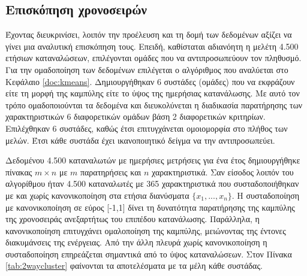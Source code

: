\subsection{Επισκόπηση χρονοσειρών}
Έχοντας διευκρινίσει, λοιπόν την προέλευση και τη δομή των δεδομένων αξίζει να γίνει μια αναλυτική επισκόπηση τους. Επειδή, καθίσταται αδιανόητη η μελέτη 4.500 ετήσιων καταναλώσεων, επιλέγονται ομάδες που να αντιπροσωπεύουν τον πληθυσμό. Για την ομαδοποίηση των δεδομένων επιλέγεται ο αλγόριθμος  που αναλύεται στο Κεφάλαιο \ref{doc:kmeans}. Δημιουργήθηκαν 6 συστάδες (ομάδες) που να εκφράζουν είτε τη μορφή της καμπύλης είτε το ύψος της ημερήσιας κατανάλωσης. Με αυτό τον τρόπο ομαδοποιούνται τα δεδομένα και διευκολύνεται η διαδικασία παρατήρησης των χαρακτηριστικών 6 διαφορετικών ομάδων βάση 2 διαφορετικών κριτηρίων. Επιλέχθηκαν 6 συστάδες, καθώς έτσι επιτυγχάνεται ομοιομορφία στο πλήθος των μελών. Έτσι κάθε συστάδα έχει ικανοποιητικό δείγμα να την αντιπροσωπεύει.\par
Δεδομένου 4.500 καταναλωτών με ημερήσιες μετρήσεις για ένα έτος δημιουργήθηκε πίνακας $m \times n$ με $m$ παρατηρήσεις και $n$ χαρακτηριστικά. Σαν είσοδος λοιπόν του αλγορίθμου  ήταν 4.500 καταναλωτές με 365 χαρακτηριστικά που συσταδοποιήθηκαν με και χωρίς κανονικοποίηση στα ετήσια διανύσματα $\{x_{1}, ..., x_{n}\}$. Η συσταδοποίηση με κανονικοποίηση σε εύρος [-1,1] δίνει τη δυνατότητα παρατήρησης της καμπύλης της χρονοσειράς ανεξαρτήτως του επιπέδου κατανάλωσης. Παράλληλα, η κανονικοποίηση επιτυγχάνει ομαλοποίηση της καμπύλης, μειώνοντας της έντονες διακυμάνσεις της ενέργειας.  Από την άλλη πλευρά χωρίς κανονικοποίηση η συσταδοποίηση επηρεάζεται σημαντικά από το ύψος καταναλώσεων. Στον Πίνακα \ref{tab:2waycluster} φαίνονται τα αποτελέσματα με τα μέλη κάθε συστάδας.\par
